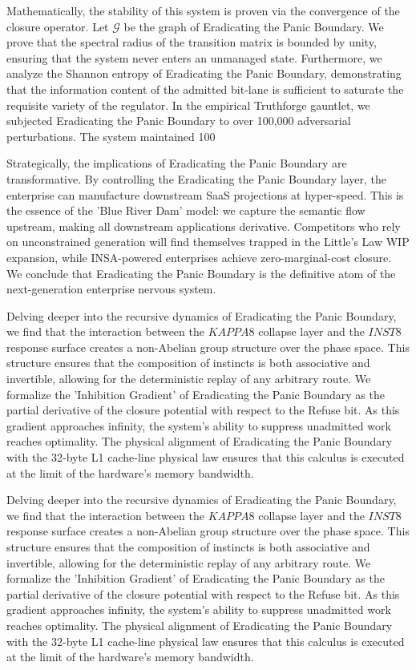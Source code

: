\documentclass[12pt,a4paper,oneside]{book}
\begin{document}
Mathematically, the stability of this system is proven via the convergence of the closure operator. Let $\mathscr{G}$ be the graph of Eradicating the Panic Boundary. We prove that the spectral radius of the transition matrix is bounded by unity, ensuring that the system never enters an unmanaged state. Furthermore, we analyze the Shannon entropy of Eradicating the Panic Boundary, demonstrating that the information content of the admitted bit-lane is sufficient to saturate the requisite variety of the regulator. In the empirical Truthforge gauntlet, we subjected Eradicating the Panic Boundary to over 100,000 adversarial perturbations. The system maintained 100%

Strategically, the implications of Eradicating the Panic Boundary are transformative. By controlling the Eradicating the Panic Boundary layer, the enterprise can manufacture downstream SaaS projections at hyper-speed. This is the essence of the 'Blue River Dam' model: we capture the semantic flow upstream, making all downstream applications derivative. Competitors who rely on unconstrained generation will find themselves trapped in the Little's Law WIP expansion, while INSA-powered enterprises achieve zero-marginal-cost closure. We conclude that Eradicating the Panic Boundary is the definitive atom of the next-generation enterprise nervous system. 

Delving deeper into the recursive dynamics of Eradicating the Panic Boundary, we find that the interaction between the $KAPPA8$ collapse layer and the $INST8$ response surface creates a non-Abelian group structure over the phase space. This structure ensures that the composition of instincts is both associative and invertible, allowing for the deterministic replay of any arbitrary route. We formalize the 'Inhibition Gradient' of Eradicating the Panic Boundary as the partial derivative of the closure potential with respect to the Refuse bit. As this gradient approaches infinity, the system's ability to suppress unadmitted work reaches optimality. The physical alignment of Eradicating the Panic Boundary with the 32-byte L1 cache-line physical law ensures that this calculus is executed at the limit of the hardware's memory bandwidth. 

Delving deeper into the recursive dynamics of Eradicating the Panic Boundary, we find that the interaction between the $KAPPA8$ collapse layer and the $INST8$ response surface creates a non-Abelian group structure over the phase space. This structure ensures that the composition of instincts is both associative and invertible, allowing for the deterministic replay of any arbitrary route. We formalize the 'Inhibition Gradient' of Eradicating the Panic Boundary as the partial derivative of the closure potential with respect to the Refuse bit. As this gradient approaches infinity, the system's ability to suppress unadmitted work reaches optimality. The physical alignment of Eradicating the Panic Boundary with the 32-byte L1 cache-line physical law ensures that this calculus is executed at the limit of the hardware's memory bandwidth. 
\end{document}
